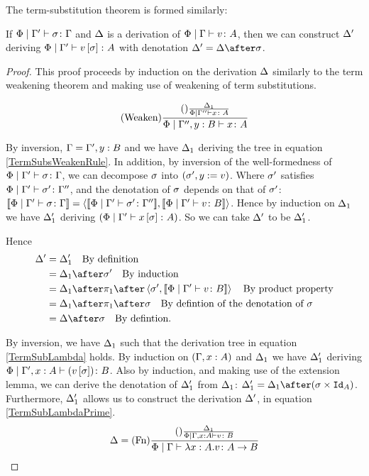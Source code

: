 \documentclass{Report}
\begin{document}
The term-substitution theorem is formed similarly: 

\begin{theorem}
    If $\Phi\mid\Gamma' \vdash \sigma \colon \Gamma$ and $\Delta$ is a derivation of $\Phi\mid\Gamma \vdash v \colon A$, then we can construct $\Delta'$ deriving $\Phi\mid\Gamma' \vdash v\left[\sigma\right] \colon A$ with denotation $\D' = \D \after \si$.
\end{theorem}


\begin{proof}
    This proof proceeds by induction on the derivation $\Delta$ similarly to the term weakening theorem and making use of weakening of term substitutions.




\begin{equation} \label{TermSubsWeakenRule}
    (\text{Weaken}) \frac{(\text{}) \frac{\Delta_1}{\Phi\mid\Gamma'' \vdash x \colon A}}{\Phi\mid\Gamma'',y: B \vdash x \colon A}
\end{equation}

By inversion, $\Gamma = \Gamma', y:B$ and we have $\Delta_1$ deriving the tree in equation \ref{TermSubsWeakenRule}. In addition, by inversion of the well-formedness of $\Phi\mid\Gamma' \vdash \sigma \colon \Gamma$, we can decompose $\sigma$ into $(\sigma', y:= v)$. Where $\sigma'$ satisfies $\Phi\mid\Gamma' \vdash \sigma' \colon \Gamma''$, and the denotation of $\sigma$ depends on that of $\sigma'$: ${\bf [\![}\Phi\mid\Gamma' \vdash \sigma \colon \Gamma{\bf ]\!]} = \left\langle{\bf [\![}\Phi\mid\Gamma' \vdash \sigma' \colon \Gamma''{\bf ]\!]}, {\bf [\![}\Phi\mid\Gamma' \vdash v \colon B{\bf ]\!]}\right\rangle$. Hence by induction on $\Delta_1$ we have $\Delta_1'$ deriving $(\Phi\mid\Gamma' \vdash x\left[\sigma\right] \colon A)$. So we can take $\Delta'$ to be $\Delta_1'$.

Hence
\begin{align}
    \D' & = \D_1' \qt{By definition}\\
        & = \D_1\after\si'\qt{By induction}\\
        & = \D_1\after\p\after\pr{\si'}{\deno{\etyperelation{\P}{\G'}{v}{B}}}\qt{By product property}\\
        & = \D_1\after\p\after\si\qt{By defintion of the denotation of $\si$}\\
        & = \D\after\si\qt{By defintion.}
\end{align}



By inversion, we have $\Delta_1$ such that the derivation tree in equation \ref{TermSubLambda} holds. By induction on $(\Gamma, x: A)$ and $\Delta_1$ we have $\Delta_1'$ deriving $\Phi\mid\Gamma', x:A \vdash (v\left[\sigma\right]) \colon B$. Also by induction, and making use of the extension lemma, we can derive the denotation of $\Delta_1'$  from $\Delta_1$: $\D_1' = \D_1\after(\si\times\Id{A})$. Furthermore, $\Delta_1'$ allows us to construct the derivation $\Delta'$, in equation \ref{TermSubLambdaPrime}.
\begin{equation}\label{TermSubLambda}
    \Delta = (\text{Fn}) \frac{
        (\text{}) \frac{\Delta_1}{\Phi\mid\Gamma, x:A \vdash v \colon B}
    }{\Phi\mid\Gamma \vdash \lambda x : A. v \colon A\rightarrow B}
\end{equation}



\end{proof}
\end{document}
